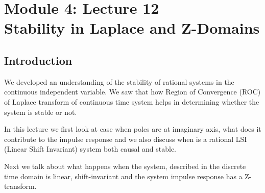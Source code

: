 \section{Module 4: Lecture 12\\Stability in Laplace and Z-Domains}

\subsection{Introduction}
We developed an understanding of the stability of rational systems in the continuous independent variable. We saw that how Region of Convergence (ROC) of Laplace transform of continuous time system helps in determining whether the system is stable or not. 

In this lecture we first look at case when poles are at imaginary axis, what does it contribute to the impulse response and we also discuss when is a rational LSI (Linear Shift Invariant) system both causal and stable.

Next we talk about what happens when the system, described in the discrete time domain is linear, shift-invariant and the system impulse response has a Z-transform.

